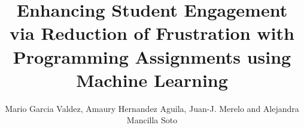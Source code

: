 \documentclass[a4paper]{llncs}
\begin{document}
\title{Enhancing Student Engagement via Reduction of Frustration with Programming Assignments using Machine Learning}

\author{Mario Garcia Valdez, Amaury Hernandez Aguila, Juan-J. Merelo and Alejandra Mancilla Soto}

\maketitle
\end{document}
